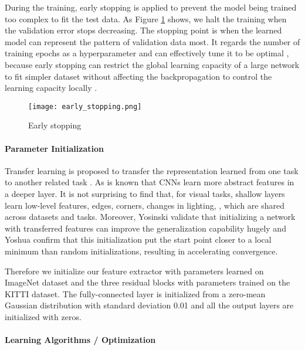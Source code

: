 During the training, early stopping is applied to prevent the model being trained too complex to fit the test data. As Figure \ref{figure:early_stopping} shows, we halt the training when the validation error stops decreasing.  The stopping point is when the learned model can represent the pattern of validation data most. It regards the number of training epochs as a hyperparameter and can effectively tune it to be optimal \cite{DBLP:journals/corr/abs-1206-5533},  because early stopping can restrict the global learning capacity of a large network to fit simpler dataset without affecting the backpropagation to control the learning capacity locally \cite{Caruana:2000:ONN:3008751.3008807}.


\begin{figure}[h]		
	\texttt{[image: early\_stopping.png]}
	\caption{Early stopping}
	\centering
	\label{figure:early_stopping}
\end{figure}

\paragraph{Parameter Initialization}

Transfer learning is proposed to transfer the representation learned from one task to another related task \cite{Pan:2010:STL:1850483.1850545}. As is known that CNNs learn more abstract features in a deeper layer. It is not surprising to find that, for visual tasks, shallow layers learn low-level features, \eg edges, corners, changes in lighting, \etc, which are shared across datasets and tasks. Moreover, Yosinski \etal validate \cite{DBLP:journals/corr/YosinskiCBL14} that initializing a network with transferred features can improve the generalization capability hugely and Yoshua \etal \cite{NIPS2006_3048} confirm that this initialization put the start point closer to a local minimum than random initializations, resulting in accelerating convergence.

Therefore we initialize our feature extractor with parameters learned on ImageNet dataset \cite{DBLP:Russakovsky14} and the three residual blocks with parameters trained on the KITTI dataset. The fully-connected layer is initialized from a zero-mean Gaussian distribution with standard deviation 0.01 and all the output layers are initialized with zeros.


\paragraph{Learning Algorithms / Optimization}

